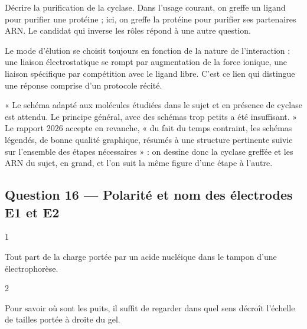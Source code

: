 \documentclass[11pt,a4paper]{article}
\begin{document}
\begin{piege}

Décrire la purification de la cyclase. Dans l'usage courant, on greffe un ligand pour purifier une protéine ; ici, on greffe la protéine pour purifier ses partenaires ARN. Le candidat qui inverse les rôles répond à une autre question.

\end{piege}

\begin{methode}

Le mode d'élution se choisit toujours en fonction de la nature de l'interaction : une liaison électrostatique se rompt par augmentation de la force ionique, une liaison spécifique par compétition avec le ligand libre. C'est ce lien qui distingue une réponse comprise d'un protocole récité.

\end{methode}

\begin{jury}

« Le schéma adapté aux molécules étudiées dans le sujet et en présence de cyclase est attendu. Le principe général, avec des schémas trop petits a été insuffisant. » Le rapport 2026 accepte en revanche, « du fait du temps contraint, les schémas légendés, de bonne qualité graphique, résumés à une structure pertinente suivie sur l'ensemble des étapes nécessaires » : on dessine donc la cyclase greffée et les ARN du sujet, en grand, et l'on suit la même figure d'une étape à l'autre.

\end{jury}

\hypertarget{question-16-polarituxe9-et-nom-des-uxe9lectrodes-e1-et-e2}{%
\subsection{Question 16 --- Polarité et nom des électrodes E1 et E2}\label{question-16-polarituxe9-et-nom-des-uxe9lectrodes-e1-et-e2}}

\begin{indication}{1}

Tout part de la charge portée par un acide nucléique dans le tampon d'une électrophorèse.

\end{indication}

\begin{indication}{2}

Pour savoir où sont les puits, il suffit de regarder dans quel sens décroît l'échelle de tailles portée à droite du gel.

\end{indication}
\end{document}
